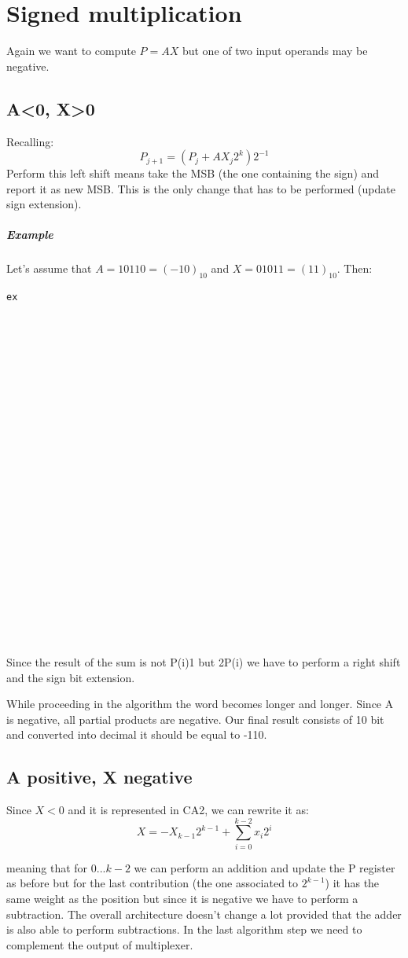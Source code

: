 \section{Signed multiplication}
Again we want to compute $P=AX$ but one of two input operands may be negative.

\subsection{A<0, X>0}
Recalling:
$$P_{j+1}=(P_j+A X_j 2^k)2^{-1}$$
Perform this left shift means take the MSB (the one containing the sign) and report it as new MSB. This is the only change that has to be performed (update sign extension).

\subparagraph{Example}
Let's assume that $A=10110=(-10)_{10}$ and $X=01011=(11)_{10}$. Then:

\begin{verbatim}
ex























\end{verbatim}

Since the result of the sum is not P(i)1 but 2P(i) we have to perform a right shift and the sign bit extension.

While proceeding in the algorithm the word becomes longer and longer. Since A is negative, all partial products are negative. Our final result consists of 10 bit and converted into decimal it should be equal to -110.

\subsection{A positive, X negative}
Since $X<0$ and it is represented in CA2, we can rewrite it as:
$$X=-X_{k-1}2^{k-1}+\sum_{i=0}^{k-2}x_i2^i$$

meaning that for $0...k-2$ we can perform an addition and update the P register as before but for the last contribution (the one associated to $2^{k-1}$) it has the same weight as the position but since it is negative we have to perform a subtraction. The overall architecture doesn't change a lot provided that the adder is also able to perform subtractions. In the last algorithm step we need to complement the output of multiplexer.


